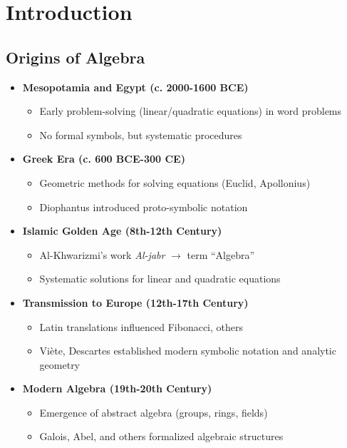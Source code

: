 \chapter{Introduction}

\section{Origins of Algebra}
\begin{itemize}
    \item \textbf{Mesopotamia and Egypt (c. 2000-1600 BCE)}
    \begin{itemize}
        \item Early problem-solving (linear/quadratic equations) in word problems
        \item No formal symbols, but systematic procedures
    \end{itemize}

    \item \textbf{Greek Era (c. 600 BCE-300 CE)}
    \begin{itemize}
        \item Geometric methods for solving equations (Euclid, Apollonius)
        \item Diophantus introduced proto-symbolic notation
    \end{itemize}

    \item \textbf{Islamic Golden Age (8th-12th Century)}
    \begin{itemize}
        \item Al-Khwarizmi's work \emph{Al-jabr} $\rightarrow$ term “Algebra”
        \item Systematic solutions for linear and quadratic equations
    \end{itemize}

    \item \textbf{Transmission to Europe (12th-17th Century)}
    \begin{itemize}
        \item Latin translations influenced Fibonacci, others
        \item Vi\`ete, Descartes established modern symbolic notation and analytic geometry
    \end{itemize}

    \item \textbf{Modern Algebra (19th-20th Century)}
    \begin{itemize}
        \item Emergence of abstract algebra (groups, rings, fields)
        \item Galois, Abel, and others formalized algebraic structures
    \end{itemize}
\end{itemize}

